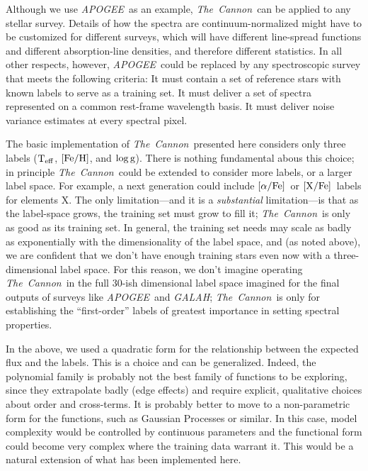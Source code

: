 \documentclass[12pt, preprint]{aastex}
\newcommand{\tc}{\textsl{The~Cannon}}
\newcommand{\apogee}{\textsl{APOGEE}}
\newcommand{\galah}{\textsl{GALAH}}
\newcommand{\teff}{\mbox{$\rm T_{eff}$}}
\newcommand{\feh}{\mbox{$\rm [Fe/H]$}}
\newcommand{\xfe}{\mbox{$\rm [X/Fe]$}}
\newcommand{\alphafe}{\mbox{$\rm [\alpha/Fe]$}}
\newcommand{\logg}{\mbox{$\rm \log g$}}
\begin{document}

 
Although we use \apogee\ as an example, \tc\ can be applied to
any stellar survey.
Details of how the spectra are continuum-normalized might have to be
customized for different surveys, which will have different
line-spread functions and different absorption-line densities, and
therefore different statistics.
In all other respects, however, \apogee\ could be replaced by any spectroscopic
survey that meets the following criteria:
It must contain a set of reference stars with known labels to serve as
a training set.
It must deliver a set of spectra represented on a common rest-frame
wavelength basis.
It must deliver noise variance estimates at every spectral pixel.



The basic implementation of \tc\ presented here considers only three
labels (\teff, \feh, and \logg).
There is nothing fundamental abous this choice; in principle
\tc\ could be extended to consider more labels, or a larger
label space.
For example, a next generation could include \alphafe\ or \xfe\
labels for elements X.
The only limitation---and it is a \emph{substantial} limitation---is
that as the label-space grows, the training set must grow to fill it;
\tc\ is only as good as its training set.
In general, the training set needs may scale as badly as exponentially
with the dimensionality of the label space, and (as noted above), we
are confident that we don't have enough training stars even now with
a three-dimensional label space.
For this reason, we don't imagine operating \tc\ in the full 30-ish
dimensional label space imagined for the final outputs of surveys like
\apogee\ and \galah; \tc\ is only for establishing the ``first-order'' labels of
greatest importance in setting spectral properties.


In the above, we used a quadratic form for the
relationship between the expected flux and the labels.
This is a choice and can be generalized.
Indeed, the polynomial family is probably not the best family of
functions to be exploring, since they extrapolate badly (edge effects)
and require explicit, qualitative choices about order and cross-terms.
It is probably better to move to a non-parametric form for the functions,
such as Gaussian Processes or similar.
In this case, model complexity would be controlled by continuous
parameters and the functional form could become very complex where the
training data warrant it.
This would be a natural extension of what has been implemented here.
\end{document}
